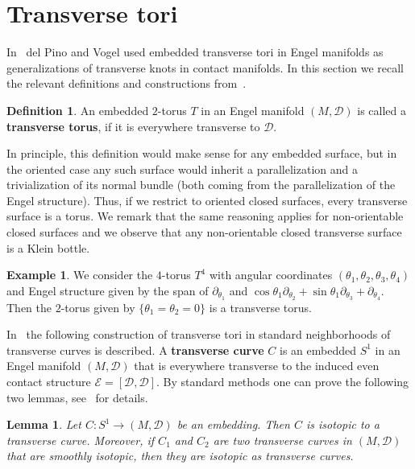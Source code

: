 \documentclass{amsart} %
\newcommand{\D}{\mathcal{D}}
\newcommand{\E}{\mathcal{E}}
\theoremstyle{thm}
\newtheorem{lem}[Theorem]{Lemma}
\theoremstyle{definition}
\newtheorem{defi}[Theorem]{Definition}
\newtheorem{ex}[Theorem]{Example}
\begin{document}
 
 




 


\section{Transverse tori}
\label{section:transverseTori} 
In~\cite{PV20} del Pino and Vogel used embedded transverse tori in Engel manifolds as generalizations of transverse knots in contact manifolds. In this section we recall the relevant definitions and constructions from~\cite{PV20}.

\begin{defi}
	An embedded $2$-torus $T$ in an Engel manifold $(M,\D)$ is called a \textbf{transverse torus}, if it is everywhere transverse to $\D$.
\end{defi}

In principle, this definition would make sense for any embedded surface, but in the oriented case any such surface would inherit a parallelization and a trivialization of its normal bundle (both coming from the parallelization of the Engel structure). Thus, if we restrict to oriented closed surfaces, every transverse surface is a torus. We remark that the same reasoning applies for non-orientable closed surfaces and we observe that any non-orientable closed transverse surface is a Klein bottle.

\begin{ex}\label{ex:homologous}
We consider the $4$-torus $T^4$ with angular coordinates $(\theta_1,\theta_2,\theta_3,\theta_4)$ and Engel structure given by the span of $\partial_{\theta_1}$ and $\cos\theta_1\partial_{\theta_2}+\sin\theta_1\partial_{\theta_3}+\partial_{\theta_4}$. Then the $2$-torus given by $\{\theta_1=\theta_2=0\}$ is a transverse torus.
\end{ex}


In~\cite{PV20} the following construction of transverse tori in standard neighborhoods of transverse curves is described. 
A \textbf{transverse curve} $C$ is an embedded $S^1$ in an Engel manifold $(M,\D)$ that is everywhere transverse to the induced even contact structure $\E=[\D,\D]$. By standard methods one can prove the following two lemmas, see~\cite[Proposition~2.7 and Lemma~2.8]{PV20} for details.

\begin{lem}\label{lem:h}
Let $C\colon S^1\rightarrow (M,\D)$ be an embedding. Then $C$ is isotopic to a transverse curve. Moreover, if $C_1$ and $C_2$ are two transverse curves in $(M,\D)$ that are smoothly isotopic, then they are isotopic as transverse curves. 
\end{lem}
\end{document}
